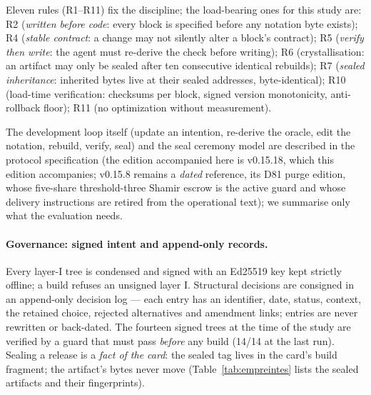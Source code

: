 \documentclass[10pt,a4paper]{article}
\begin{document}
Eleven rules (R1--R11) fix the discipline; the load-bearing ones for this
study are: R2 (\emph{written before code}: every block is specified before
any notation byte exists); R4 (\emph{stable contract}: a change may not
silently alter a block's contract); R5 (\emph{verify then write}: the
agent must re-derive the check before writing); R6 (crystallisation: an
artifact may only be sealed after ten consecutive identical rebuilds);
R7 (\emph{sealed inheritance}: inherited bytes live at their sealed
addresses, byte-identical); R10 (load-time verification: checksums per
block, signed version monotonicity, anti-rollback floor); R11 (no
optimization without measurement).

The development loop itself (update an intention, re-derive the oracle,
edit the notation, rebuild, verify, seal) and the seal ceremony model are
described in the protocol specification (the edition accompanied here is v0.15.18, which this edition accompanies; v0.15.8 remains a \emph{dated} reference, its D81 purge edition, whose five-share threshold-three Shamir escrow is the active guard and whose delivery instructions are retired from the operational text); we summarise only what the evaluation needs.

\paragraph{Governance: signed intent and append-only records.}
Every layer-I tree is condensed and signed with an Ed25519 key kept
strictly offline; a build refuses an unsigned layer I. Structural
decisions are consigned in an append-only decision log --- each entry has
an identifier, date, status, context, the retained choice, rejected
alternatives and amendment links; entries are never rewritten or
back-dated. The fourteen signed trees at the time of the study are verified
by a guard that must pass \emph{before} any build (14/14 at the last
run). Sealing a release is a \emph{fact of the card}: the sealed tag
lives in the card's build fragment; the artifact's bytes never move
(Table~\ref{tab:empreintes} lists the sealed artifacts and their
fingerprints).
\end{document}
